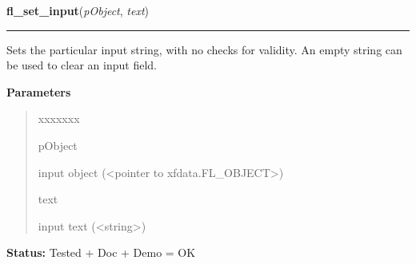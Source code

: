     \label{xformslib:library:fl_set_input}

    \vspace{0.5ex}

\hspace{.8\funcindent}\begin{boxedminipage}{\funcwidth}

    \raggedright \textbf{fl\_set\_input}(\textit{pObject}, \textit{text})

    \vspace{-1.5ex}

    \rule{\textwidth}{0.5\fboxrule}
\setlength{\parskip}{2ex}
    Sets the particular input string, with no checks for validity. An empty
    string can be used to clear an input field.

\setlength{\parskip}{1ex}
      \textbf{Parameters}
      \vspace{-1ex}

      \begin{quote}
        \begin{Ventry}{xxxxxxx}

          \item[pObject]

          input object ({\textless}pointer to 
          xfdata.FL\_OBJECT{\textgreater})

          \item[text]

          input text ({\textless}string{\textgreater})

        \end{Ventry}

      \end{quote}

\textbf{Status:} Tested + Doc + Demo = OK



    \end{boxedminipage}

    \label{xformslib:library:fl_set_input_color}

    \vspace{0.5ex}

